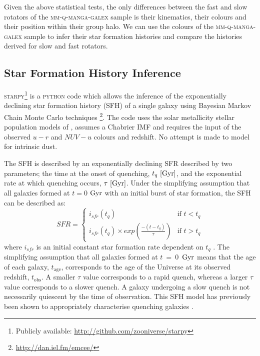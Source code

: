 \documentclass[useAMS,usenatbib]{mn2e}
\begin{document}
Given the above statistical tests, the only differences between the fast and slow rotators of the \textsc{mm-q-manga-galex} sample is their kinematics, their colours and their position within their group halo. We can use the colours of the \textsc{mm-q-manga-galex} sample to infer their star formation histories and compare the histories derived for slow and fast rotators. 


\subsection{Star Formation History Inference}\label{sec:starpy}

\textsc{starpy}\footnote{Publicly available: \url{http://github.com/zooniverse/starpy}} is a \textsc{python} code which allows the inference of the exponentially declining star formation history (SFH) of a single galaxy using  Bayesian Markov Chain Monte Carlo techniques \citep{emcee13}\footnote{\url{http://dan.iel.fm/emcee/}}. The code uses the solar metallicity stellar population models of \cite[][hereafter BC03]{BC03}, assumes a Chabrier IMF \citep{chabrier03} and requires the input of the observed $u-r$ and $NUV-u$ colours and redshift. No attempt is made to model for intrinsic dust. 

The SFH is described by an exponentially declining SFR described by two parameters; the time at the onset of quenching, $t_q~\rm{[Gyr]}$, and the exponential rate at which quenching occurs, $\tau~\rm{[Gyr]}$. Under the simplifying assumption that all galaxies formed at $t=0$ $\rm{ Gyr}$ with an initial burst of star formation, the SFH can be described as:
\begin{equation}\label{sfh}
SFR =
\begin{cases}
i_{sfr}(t_q) & \text{if } t < t_q \\
i_{sfr}(t_q) \times exp{\left( \frac{-(t-t_{q})}{\tau}\right)} & \text{if } t > t_q 
\end{cases}
\end{equation}
where $i_{sfr}$ is an initial constant star formation rate dependent on $t_q$ \citep{schawinski14, smethurst15}. The simplifying assumption that all galaxies formed at $t~=~0$~$\rm{Gyr}$ means that the age of each galaxy, $t_\mathrm{age}$, corresponds to the age of the Universe at its observed redshift, $t_\mathrm{obs}$. A smaller $\tau$ value corresponds to a rapid quench, whereas a larger $\tau$ value corresponds to a slower quench. A galaxy undergoing a slow quench is not necessarily quiescent by the time of observation. This SFH model has previously been shown to appropriately characterise quenching galaxies \citep{Weiner06, Martin07, Noeske07,schawinski14}. 
\end{document}
